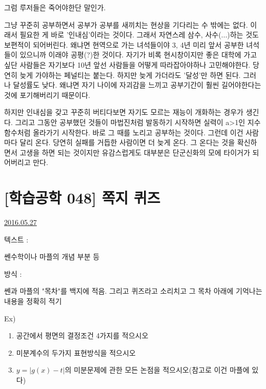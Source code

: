 그럼 루저들은 죽어야한단 말인가.
\vspace{5mm}

그냥 꾸준히 공부하면서 공부가 공부를 새끼치는 현상을 기다리는 수 밖에는 없다.
이래서 필요한 게 바로 '인내심'이라는 것이다. 그래서 자연스레 삼수, 사수(...)하는 것도 보편적이 되어버린다.
왜냐면 현역으로 가는 녀석들이야 3, 4년 미리 앞서 공부한 녀석들이 있으니까 이래야 공평(?)한 것이다.
자기가 비록 현시창이지만 좋은 대학에 가고싶단 사람들은 자기보다 10년 앞선 사람들을 어떻게 따라잡아야하나 고민해야한다.
당연히 늦게 가야하는 페널티는 붙는다. 하지만 늦게 가더라도 '달성'만 하면 된다. 그러나 달성률도 낮다.
왜냐면 자기 나이에 자괴감을 느끼고 공부기간이 훨씬 길어야한다는 것에 포기해버리기 때문이다.
\vspace{5mm}

하지만 인내심을 갖고 꾸준히 버티다보면 자기도 모르는 재능이 개화하는 경우가 생긴다.
그리고 그동안 공부했던 것들이 마법진처럼 발동하기 시작하면 실력이 a>1인 지수함수처럼 올라가기 시작한다.
바로 그 때를 노리고 공부하는 것이다. 그런데 이건 사람마다 달리 온다. 당연히 실패를 거듭한 사람이면 더 늦게 온다.
그 온다는 것을 확신하면서 고생을 하면 되는 것이지만 유감스럽게도 대부분은 단군신화의 모에 타이거가 되어버리고 만다.
\vspace{5mm}










\section{[학습공학 048] 쪽지 퀴즈}
\href{https://www.kockoc.com/Apoc/795077}{2016.05.27}

\vspace{5mm}

텍스트 :
\vspace{5mm}

쎈수학이나 마플의 개념 부분 등
\vspace{5mm}

방식 :
\vspace{5mm}

쎈과 마플의 "목차"를 백지에 적음. 그리고 퀴즈라고 소리치고 그 목차 아래에 기억나는 내용을 정확히 적기
\vspace{5mm}

Ex)
\vspace{5mm}
\begin{enumerate}
    \item 공간에서 평면의 결정조건 4가지를 적으시오
    \vspace{5mm}
    
    \item 미분계수의 두가지 표현방식을 적으시오
    \vspace{5mm}
    
    \item  $y=|g(x)-t|$의 미분문제에 관한 모든 논점을 적으시오(참고로 이건 마플에 있다)
    \vspace{5mm}
\end{enumerate}

